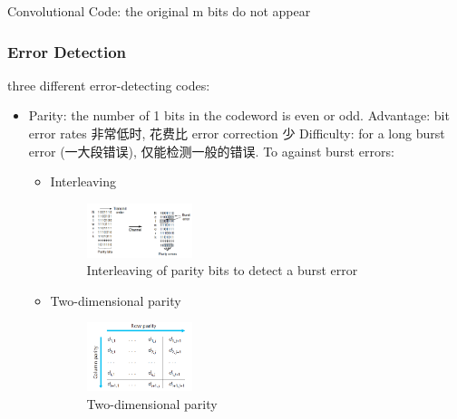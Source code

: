 Convolutional Code: the original m bits do not appear %


\subsubsection{Error Detection}
three different error-detecting codes:
\begin{itemize}
    \item Parity: the number of 1 bits in the codeword is even or odd.
    \subitem Advantage: bit error rates 非常低时, 花费比 error correction 少
    \subitem Difficulty: for a long burst error (一大段错误), 仅能检测一般的错误. To against burst errors:
    \begin{itemize}
        \item Interleaving
        \begin{figure}[!htb]
            \centering
            \includegraphics[width=0.309\textwidth]{pic/CN3/Interleaving}
            \caption{Interleaving of parity bits to detect a burst error}
        \end{figure}
        \item Two-dimensional parity
        \begin{figure}[!htb]
            \centering
            \includegraphics[width=0.309\textwidth]{pic/CN3/Two-dimensional parity}
            \caption{Two-dimensional parity}
        \end{figure}
        

\end{itemize}
\end{itemize}
